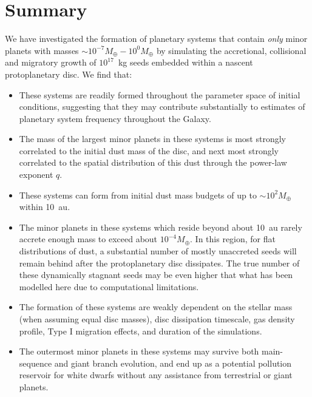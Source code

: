 \documentclass[useAMS,usenatbib]{mn2e}
\newcommand{\rev}{ }
\begin{document}
\section{Summary}

We have investigated the formation of planetary systems that contain {\it only} minor planets with masses $\sim 10^{-7}M_{\oplus}-10^{0}M_{\oplus}$ by simulating the accretional, collisional and migratory growth of $10^{17}$~kg seeds embedded within a nascent protoplanetary disc. We find that:

\begin{itemize}

\item These systems are readily formed throughout the parameter space of initial conditions, suggesting that they may contribute substantially to estimates of planetary system frequency throughout the Galaxy.

\item The mass of the largest minor planets in these systems is most strongly correlated to the initial dust mass of the disc, and next most strongly correlated to the spatial distribution of this dust through the power-law exponent $q$.

\item These systems can form from initial dust mass budgets of up to $\sim 10^{2}M_{\oplus}$ within 10~au.

\item The minor planets in these systems which reside beyond about 10~au rarely accrete enough mass to exceed about $10^{-4}M_{\oplus}$. In this region, for flat distributions of dust, a substantial number of mostly unaccreted seeds will remain behind after the protoplanetary disc dissipates. {\rev The true number of these dynamically stagnant seeds may be even higher that what has been modelled here due to computational limitations.}

\item The formation of these systems are weakly dependent on the stellar mass {\rev (when assuming equal disc masses)}, disc dissipation timescale, gas density profile, Type I migration effects, and duration of the simulations.

\item The outermost minor planets in these systems may survive both main-sequence and giant branch evolution, and end up as a potential pollution reservoir for white dwarfs without any assistance from terrestrial or giant planets. 

\end{itemize}
\end{document}
